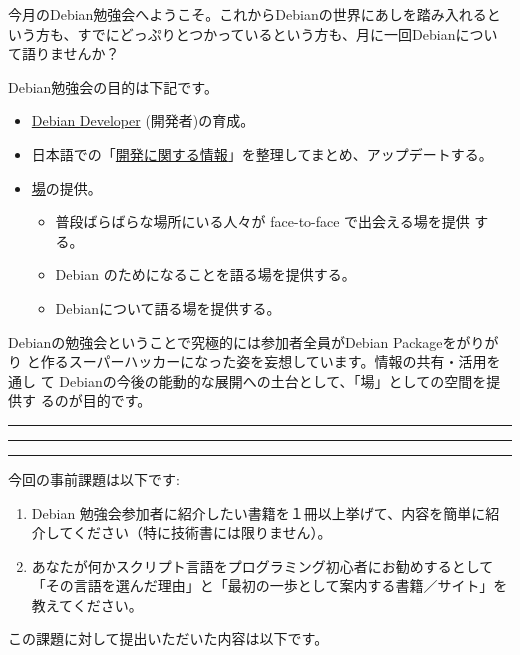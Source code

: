 \documentclass[mingoth,a4paper]{jsarticle}
\begin{document}
\begin{multicols}{2}
 

 今月のDebian勉強会へようこそ。これからDebianの世界にあしを踏み入れると
 いう方も、すでにどっぷりとつかっているという方も、月に一回Debianについ
 て語りませんか？

 Debian勉強会の目的は下記です。

 \begin{itemize}
 \item \underline{Debian Developer} (開発者)の育成。
 \item 日本語での「\underline{開発に関する情報}」を整理してまとめ、アップデートする。
 \item \underline{場}の提供。
 \begin{itemize}
  \item 普段ばらばらな場所にいる人々が face-to-face で出会える場を提供
	する。
  \item Debian のためになることを語る場を提供する。
  \item Debianについて語る場を提供する。
 \end{itemize}
 \end{itemize}		

 Debianの勉強会ということで究極的には参加者全員がDebian Packageをがりがり
 と作るスーパーハッカーになった姿を妄想しています。情報の共有・活用を通し
 て Debianの今後の能動的な展開への土台として、「場」としての空間を提供す
 るのが目的です。

\end{multicols}

\newpage

\begin{minipage}[b]{0.2\hsize}
 \colorbox{titleback}{}
\end{minipage}
\begin{minipage}[b]{0.8\hsize}
\hrule
\vspace{2mm}
\hrule
\begin{multicols}{2}
\tableofcontents
\end{multicols}
\vspace{2mm}
\hrule
\end{minipage}


今回の事前課題は以下です:
\begin{enumerate}
 \item  Debian 勉強会参加者に紹介したい書籍を１冊以上挙げて、内容を簡単に紹介してください（特に技術書には限りません）。
 \item  あなたが何かスクリプト言語をプログラミング初心者にお勧めするとして「その言語を選んだ理由」と「最初の一歩として案内する書籍／サイト」を教えてください。
\end{enumerate}
この課題に対して提出いただいた内容は以下です。
\begin{multicols}{2}
{\small
 
}
\end{multicols}
\end{document}
